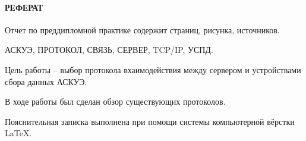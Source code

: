 \newpage
{}
\paragraph*{\hfill РЕФЕРАТ \hfill}
Отчет по преддипломной практике содержит  страниц,  рисунка,  источников. %

АСКУЭ, ПРОТОКОЛ, СВЯЗЬ, СЕРВЕР, TCP/IP, УСПД.

Цель работы -- выбор протокола вхаимодействия между сервером и устройствами сбора данных АСКУЭ.

В ходе работы был сделан обзор существующих протоколов.

Пояснительная записка выполнена при помощи системы компьютерной вёрстки \LaTeX.